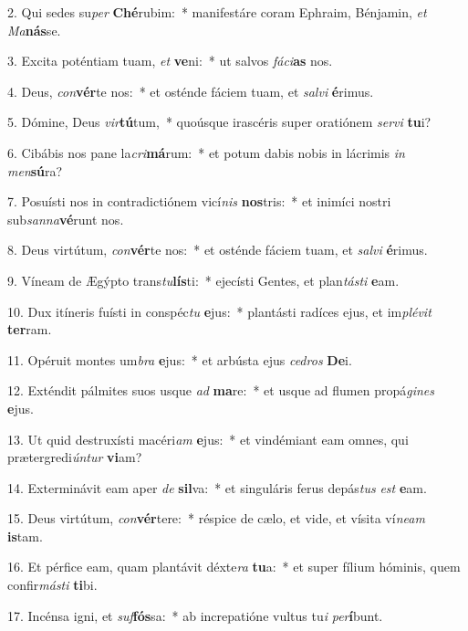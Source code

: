 2. Qui sedes su\textit{per} \textbf{Ché}rubim:~*  manifestáre coram Ephraim, Bénjamin, \textit{et} \textit{Ma}\textbf{nás}se.\

3. Excita poténtiam tuam, \textit{et} \textbf{ve}ni:~*  ut salvos \textit{fá}\textit{ci}\textbf{as} nos.\

4. Deus, \textit{con}\textbf{vér}te nos:~*  et osténde fáciem tuam, et \textit{sal}\textit{vi} \textbf{é}rimus.\

5. Dómine, Deus \textit{vir}\textbf{tú}tum,~*  quoúsque irascéris super oratiónem \textit{ser}\textit{vi} \textbf{tu}i?\

6. Cibábis nos pane la\textit{cri}\textbf{má}rum:~*  et potum dabis nobis in lácrimis \textit{in} \textit{men}\textbf{sú}ra?\

7. Posuísti nos in contradictiónem vicí\textit{nis} \textbf{nos}tris:~*  et inimíci nostri sub\textit{san}\textit{na}\textbf{vé}runt nos.\

8. Deus virtútum, \textit{con}\textbf{vér}te nos:~*  et osténde fáciem tuam, et \textit{sal}\textit{vi} \textbf{é}rimus.\

9. Víneam de Ægýpto trans\textit{tu}\textbf{lís}ti:~*  ejecísti Gentes, et plan\textit{tás}\textit{ti} \textbf{e}am.\

10. Dux itíneris fuísti in conspéc\textit{tu} \textbf{e}jus:~*  plantásti radíces ejus, et im\textit{plé}\textit{vit} \textbf{ter}ram.\

11. Opéruit montes um\textit{bra} \textbf{e}jus:~*  et arbústa ejus \textit{ce}\textit{dros} \textbf{De}i.\

12. Exténdit pálmites suos usque \textit{ad} \textbf{ma}re:~*  et usque ad flumen propá\textit{gi}\textit{nes} \textbf{e}jus.\

13. Ut quid destruxísti macéri\textit{am} \textbf{e}jus:~*  et vindémiant eam omnes, qui prætergredi\textit{ún}\textit{tur} \textbf{vi}am?\

14. Exterminávit eam aper \textit{de} \textbf{sil}va:~*  et singuláris ferus depás\textit{tus} \textit{est} \textbf{e}am.\

15. Deus virtútum, \textit{con}\textbf{vér}tere:~*  réspice de cælo, et vide, et vísita ví\textit{ne}\textit{am} \textbf{is}tam.\

16. Et pérfice eam, quam plantávit déxte\textit{ra} \textbf{tu}a:~*  et super fílium hóminis, quem confir\textit{más}\textit{ti} \textbf{ti}bi.\

17. Incénsa igni, et \textit{suf}\textbf{fós}sa:~*  ab increpatióne vultus tu\textit{i} \textit{per}\textbf{í}bunt.\

